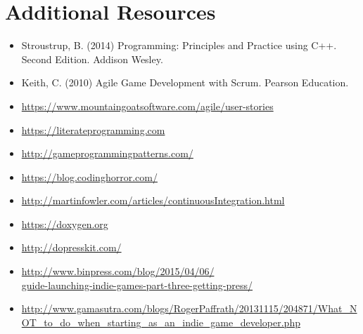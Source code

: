 \documentclass{../fal_assignment}
\begin{document}
\section*{Additional Resources}

\begin{itemize}
    \item Stroustrup, B. (2014) Programming: Principles and Practice using C++. Second Edition. Addison Wesley.
    \item Keith, C. (2010) Agile Game Development with Scrum. Pearson Education.
    \item \url{https://www.mountaingoatsoftware.com/agile/user-stories}
    \item \url{https://literateprogramming.com}
    \item \url{http://gameprogrammingpatterns.com/}
    \item \url{https://blog.codinghorror.com/}
    \item \url{http://martinfowler.com/articles/continuousIntegration.html}
    \item \url{https://doxygen.org}
    \item \url{http://dopresskit.com/}
    \item \url{http://www.binpress.com/blog/2015/04/06/}\\ \url{guide-launching-indie-games-part-three-getting-press/}
    \item \url{http://www.gamasutra.com/blogs/RogerPaffrath/20131115/204871/What_NOT_to_do_when_starting_as_an_indie_game_developer.php}
\end{itemize}
\end{document}
